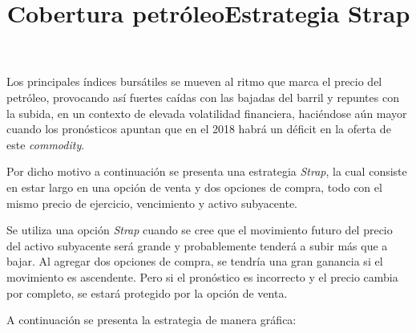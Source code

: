 \title{Cobertura petr\'oleo}
Los principales \'indices burs\'atiles se mueven al ritmo que marca el precio del petr\'oleo, provocando as\'i fuertes ca\'idas con las bajadas del barril y repuntes con la subida, en un contexto de elevada volatilidad financiera, haci\'endose a\'un mayor cuando los pron\'osticos apuntan que en el 2018 habr\'a un d\'eficit en la oferta de este \textit{commodity}. 


\title{Estrategia Strap}
Por dicho motivo a continuaci\'on se presenta una estrategia \textit{Strap}, la cual consiste en estar largo en una opci\'on de venta y dos opciones de compra, todo con el mismo precio de ejercicio, vencimiento y activo subyacente. 

Se utiliza una opci\'on \textit{Strap} cuando se cree que el movimiento futuro del precio del activo subyacente ser\'a grande y probablemente tender\'a a subir m\'as que a bajar. Al agregar dos opciones de compra, se tendr\'ia una gran ganancia si el movimiento es ascendente. Pero si el pron\'ostico es incorrecto y el precio cambia por completo, se estar\'a protegido por la opci\'on de venta.

A continuaci\'on se presenta la estrategia de manera gr\'afica: 


